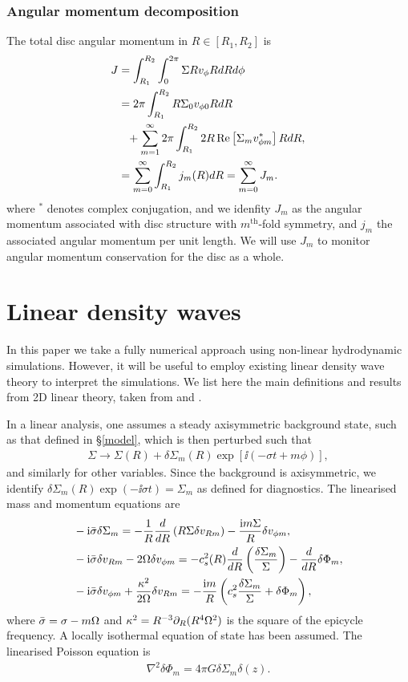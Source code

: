 \subsubsection{Angular momentum decomposition}
The total disc angular momentum in $R\in[R_1,R_2]$ is
\begin{align}
  J &= \int_{R_1}^{R_2}\int_0^{2\pi} \Sigma Rv_\phi RdRd\phi \notag\\
  &= 2\pi\int_{R_1}^{R_2}R\Sigma_0 v_{\phi0} R dR \notag\\ 
  &\phantom{=}+
  \sum_{m=1}^\infty2\pi\int_{R_1}^{R_2} 2R\operatorname{Re}\left[\Sigma_m v_{\phi
      m}^*\right] RdR, \notag\\
  &= \sum_{m=0}^\infty \int_{R_1}^{R_2}  j_m(R) dR = \sum_{m=0}^\infty J_m. 
\end{align}
where $^*$ denotes complex conjugation, and we idenfity $J_m$ as the 
angular momentum associated with disc structure with
$m^\mathrm{th}$-fold symmetry, and $j_m$ the associated angular
momentum per unit length. We will use $J_m$ to monitor angular momentum 
conservation for the disc as a whole.  

\section{Linear density waves}\label{wkb}
In this paper we take a fully numerical approach using non-linear
hydrodynamic simulations. However, it will be useful to employ
existing linear density wave theory to interpret the simulations. 
We list here the main definitions and results from 2D linear theory,
taken from \cite{lin11} and \cite{shu91}.  

In a linear analysis, one assumes a steady axisymmetric background state, such as
that defined in \S\ref{model}, which is then perturbed such that
\begin{align}  
  \Sigma \to \Sigma(R) + \delta\Sigma_m(R)\exp{\left[\ii\left(-\sigma t +
        m\phi\right)\right]}, 
\end{align}
and similarly for other variables. Since the background is
axisymmetric, we identify $\delta\Sigma_m(R)\exp{\left(-\ii\sigma
    t\right)} = \Sigma_m$ as defined for diagnostics. 
The linearised mass and momentum equations are
\begin{align}
  &-\mathrm{i}\bar{\sigma} \delta\Sigma_m = -\frac{1}{R}\frac{d}{dR}\left(R\Sigma\delta
    v_{Rm}\right) - \frac{\mathrm{i} m \Sigma}{R}\delta v_{\phi m}, \\
  &-\mathrm{i}\bar{\sigma}\delta v_{Rm} - 2\Omega \delta v_{\phi m} = -
  c_s^2(R)\frac{d}{dR}\left(\frac{\delta\Sigma_m}{\Sigma}\right) - \frac{d}{dR}\delta\Phi_m,\\
  & -\mathrm{i}\bar{\sigma}\delta v_{\phi m} + \frac{\kappa^2}{2\Omega}\delta v_{Rm} =
  -\frac{\mathrm{i} m }{R}\left(c_s^2\frac{\delta\Sigma_m}{\Sigma} + \delta\Phi_m\right),
\end{align}
where $\bar{\sigma} = \sigma - m\Omega$ and $\kappa^2 =
R^{-3}\partial_R(R^4\Omega^2)$ is the square of the epicycle frequency. A
locally isothermal equation of state has been assumed.    
The linearised Poisson equation is 
\begin{align}
  \nabla^2\delta\Phi_m = 4\pi G \delta\Sigma_m \delta(z). 
\end{align}

